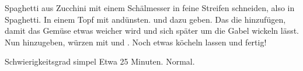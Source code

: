 \begin{recipe}{Spaghetti aus Zucchini}
	 mit einem Schälmesser in feine Streifen schneiden, also in Spaghetti. In einem Topf mit
	 andünsten. 
	 und
	 dazu geben. Das die
	 hinzufügen, damit das Gemüse etwas weicher wird und sich später um die Gabel wickeln lässt. Nun
	 hinzugeben, würzen mit
	 und
	. Noch etwas köcheln lassen und fertig!
	\item{Schwierigkeitsgrad} simpel
	\preparationtime Etwa 25 Minuten.
	\washingup Normal.
\end{recipe}